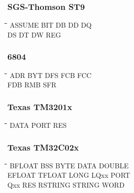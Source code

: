 \subsubsection{SGS-Thomson ST9}
{\tt\begin{tabbing}
\hspace{3cm}\=\hspace{3cm}\=\hspace{3cm}\=\hspace{3cm}\=\kill
ASSUME     \> BIT         \> DB          \> DD          \> DQ \\
DS         \> DT          \> DW          \> REG \\
\end{tabbing}}

\subsubsection{6804}
{\tt\begin{tabbing}
\hspace{3cm}\=\hspace{3cm}\=\hspace{3cm}\=\hspace{3cm}\=\kill
ADR        \> BYT         \> DFS         \> FCB         \> FCC \\
FDB        \> RMB         \> SFR \\
\end{tabbing}}

\subsubsection{Texas TM3201x}
{\tt\begin{tabbing}
\hspace{3cm}\=\hspace{3cm}\=\hspace{3cm}\=\hspace{3cm}\=\kill
DATA       \> PORT        \> RES \\
\end{tabbing}}

\subsubsection{Texas TM32C02x}
{\tt\begin{tabbing}
\hspace{3cm}\=\hspace{3cm}\=\hspace{3cm}\=\hspace{3cm}\=\kill
BFLOAT     \> BSS         \> BYTE        \> DATA        \> DOUBLE \\ 
EFLOAT     \> TFLOAT      \> LONG        \> LQxx        \> PORT \\
Qxx        \> RES         \> RSTRING     \> STRING      \> WORD \\
\end{tabbing}}

